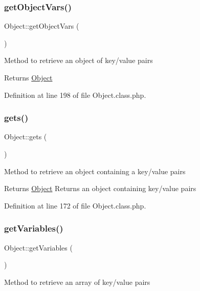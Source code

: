 \subsubsection{\texorpdfstring{get\+Object\+Vars()}{getObjectVars()}}
{\footnotesize\ttfamily Object\+::get\+Object\+Vars (\begin{DoxyParamCaption}{ }\end{DoxyParamCaption})}

Method to retrieve an object of key/value pairs

\begin{DoxyReturn}{Returns}
\hyperlink{classObject}{Object} 
\end{DoxyReturn}


Definition at line 198 of file Object.\+class.\+php.

\mbox{\label{classObject_ad6f51071a4048c1fed581748065e4d68}} 
\subsubsection{\texorpdfstring{gets()}{gets()}}
{\footnotesize\ttfamily Object\+::gets (\begin{DoxyParamCaption}{ }\end{DoxyParamCaption})}

Method to retrieve an object containing a key/value pairs

\begin{DoxyReturn}{Returns}
\hyperlink{classObject}{Object} Returns an object containing key/value pairs 
\end{DoxyReturn}


Definition at line 172 of file Object.\+class.\+php.

\mbox{\label{classObject_ad33c509ec041fb43c6e25f8155577925}} 
\subsubsection{\texorpdfstring{get\+Variables()}{getVariables()}}
{\footnotesize\ttfamily Object\+::get\+Variables (\begin{DoxyParamCaption}{ }\end{DoxyParamCaption})}

Method to retrieve an array of key/value pairs

